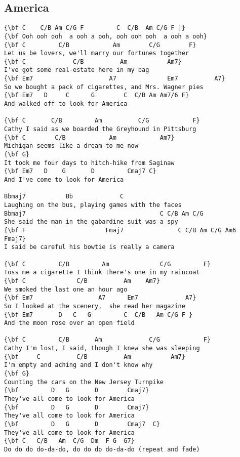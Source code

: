 \documentclass[a4paper]{article}
\begin{document}
\subsection{America} %
\label{sub:Americ}
\begin{Verbatim}[commandchars=\\\{\}]
{\bf C    C/B Am C/G F         C  C/B  Am C/G F ]}
{\bf Ooh ooh ooh  a ooh a ooh, ooh ooh ooh  a ooh a ooh}
{\bf C         C/B            Am        C/G        F}
Let us be lovers, we'll marry our fortunes together
{\bf C             C/B          Am           Am7}
I've got some real-estate here in my bag
{\bf Em7                     A7              Em7          A7}
So we bought a pack of cigarettes, and Mrs. Wagner pies
{\bf Em7   D     C      G        C  C/B Am Am7/6 F}
And walked off to look for America

{\bf C       C/B         Am          C/G            F}
Cathy I said as we boarded the Greyhound in Pittsburg
{\bf C        C/B            Am            Am7}
Michigan seems like a dream to me now
{\bf G}
It took me four days to hitch-hike from Saginaw
{\bf Em7   D    G       D         Cmaj7 C}
And I've come to look for America

Bbmaj7           Bb             C
Laughing on the bus, playing games with the faces
Bbmaj7                                     C C/B Am C/G
She said the man in the gabardine suit was a spy
{\bf F                      Fmaj7               C C/B Am C/G Am6 Fmaj7}
I said be careful his bowtie is really a camera

{\bf C         C/B         Am              C/G         F}
Toss me a cigarette I think there's one in my raincoat
{\bf C              C/B          Am    Am7}
We smoked the last one an hour ago
{\bf Em7                  A7      Em7             A7}
So I looked at the scenery,  she read her magazine
{\bf Em7       D   C   G         C  C/B   Am C/G F }
And the moon rose over an open field

{\bf C         C/B       Am             C/G            F}
Cathy I'm lost, I said, though I knew she was sleeping
{\bf     C          C/B          Am           Am7}
I'm empty and aching and I don't know why
{\bf G}
Counting the cars on the New Jersey Turnpike
{\bf         D   G       D        Cmaj7}
They've all come to look for America
{\bf         D   G       D        Cmaj7}
They've all come to look for America
{\bf         D   G       D        Cmaj7  C}
They've all come to look for America
{\bf C   C/B   Am  C/G  Dm  F G  G7}
Do do do do-da-do, do do do do-da-do (repeat and fade)
\end{Verbatim}
\newpage
\end{document}
